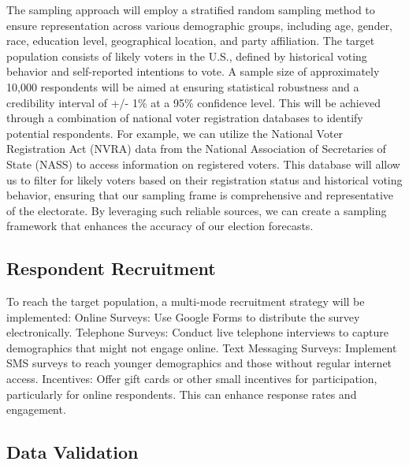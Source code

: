 \documentclass[
  letterpaper,
  DIV=11,
  numbers=noendperiod]{scrartcl}
\begin{document}
The sampling approach will employ a stratified random sampling method to
ensure representation across various demographic groups, including age,
gender, race, education level, geographical location, and party
affiliation. The target population consists of likely voters in the
U.S., defined by historical voting behavior and self-reported intentions
to vote. A sample size of approximately 10,000 respondents will be aimed
at ensuring statistical robustness and a credibility interval of +/- 1\%
at a 95\% confidence level. This will be achieved through a combination
of national voter registration databases to identify potential
respondents. For example, we can utilize the National Voter Registration
Act (NVRA) data from the National Association of Secretaries of State
(NASS) to access information on registered voters. This database will
allow us to filter for likely voters based on their registration status
and historical voting behavior, ensuring that our sampling frame is
comprehensive and representative of the electorate. By leveraging such
reliable sources, we can create a sampling framework that enhances the
accuracy of our election forecasts.

\hypertarget{respondent-recruitment}{%
\subsection{Respondent Recruitment}\label{respondent-recruitment}}

To reach the target population, a multi-mode recruitment strategy will
be implemented: Online Surveys: Use Google Forms to distribute the
survey electronically. Telephone Surveys: Conduct live telephone
interviews to capture demographics that might not engage online. Text
Messaging Surveys: Implement SMS surveys to reach younger demographics
and those without regular internet access. Incentives: Offer gift cards
or other small incentives for participation, particularly for online
respondents. This can enhance response rates and engagement.

\hypertarget{data-validation}{%
\subsection{Data Validation}\label{data-validation}}
\end{document}
